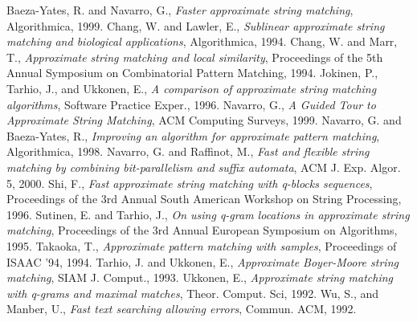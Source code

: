 \documentclass[10pt]{article}
\begin{document}
\begin{thebibliography}{999}

 Baeza-Yates, R. and Navarro, G., \textit{Faster approximate string matching}, Algorithmica, 1999.
 Chang, W. and Lawler, E., \textit{Sublinear approximate string matching and biological applications}, Algorithmica, 1994.
 Chang, W. and Marr, T., \textit{Approximate string matching and local similarity}, Proceedings of the 5th Annual Symposium on Combinatorial Pattern Matching, 1994.
 Jokinen, P., Tarhio, J., and Ukkonen, E., \textit{A comparison of approximate string matching algorithms}, Software Practice Exper., 1996.
 Navarro, G., \textit{A Guided Tour to Approximate String Matching}, ACM Computing Surveys, 1999.
 Navarro, G. and Baeza-Yates, R., \textit{Improving an algorithm for approximate pattern matching}, Algorithmica, 1998.
 Navarro, G. and Raffinot, M., \textit{Fast and flexible string matching by combining bit-parallelism and suffix automata}, ACM J. Exp. Algor. 5, 2000.
 Shi, F., \textit{Fast approximate string matching with q-blocks sequences}, Proceedings of the 3rd Annual South American Workshop on String Processing, 1996.
 Sutinen, E. and Tarhio, J., \textit{On using q-gram locations in approximate string matching}, Proceedings of the 3rd Annual European Symposium on Algorithms, 1995.
 Takaoka, T., \textit{Approximate pattern matching with samples}, Proceedings of ISAAC '94, 1994.
 Tarhio, J. and Ukkonen, E., \textit{Approximate Boyer-Moore string matching}, SIAM J. Comput., 1993.
 Ukkonen, E., \textit{Approximate string matching with q-grams and maximal matches}, Theor. Comput. Sci, 1992.
 Wu, S., and Manber, U., \textit{Fast text searching allowing errors}, Commun. ACM, 1992.

\end{thebibliography}

\end{document}
